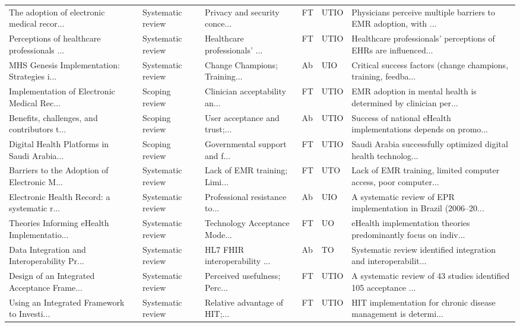 \begin{longtable}{p{3.4cm} >{\centering\arraybackslash}p{0.7cm} p{1.9cm} p{2.4cm} >{\centering\arraybackslash}p{0.8cm} >{\centering\arraybackslash}p{1.1cm} p{3.4cm}}
The adoption of electronic medical recor... & 2020 & Systematic review & Privacy and security conce... & FT & UTIO & Physicians perceive multiple barriers to EMR adoption, with ... \\
Perceptions of healthcare professionals ... & 2020 & Systematic review & Healthcare professionals' ... & FT & UTIO & Healthcare professionals' perceptions of EHRs are influenced... \\
MHS Genesis Implementation: Strategies i... & 2020 & Systematic review & Change Champions; Training... & Ab & UIO & Critical success factors (change champions, training, feedba... \\
Implementation of Electronic Medical Rec... & 2021 & Scoping review & Clinician acceptability an... & FT & UTIO & EMR adoption in mental health is determined by clinician per... \\
Benefits, challenges, and contributors t... & 2021 & Scoping review & User acceptance and trust;... & Ab & UTIO & Success of national eHealth implementations depends on promo... \\
Digital Health Platforms in Saudi Arabia... & 2021 & Scoping review & Governmental support and f... & FT & UTIO & Saudi Arabia successfully optimized digital health technolog... \\
Barriers to the Adoption of Electronic M... & 2021 & Systematic review & Lack of EMR training; Limi... & FT & UTO & Lack of EMR training, limited computer access, poor computer... \\
Electronic Health Record: a systematic r... & 2021 & Systematic review & Professional resistance to... & Ab & UIO & A systematic review of EPR implementation in Brazil (2006–20... \\
Theories Informing eHealth Implementatio... & 2021 & Systematic review & Technology Acceptance Mode... & FT & UO & eHealth implementation theories predominantly focus on indiv... \\
Data Integration and Interoperability Pr... & 2021 & Systematic review & HL7 FHIR interoperability ... & Ab & TO & Systematic review identified integration and interoperabilit... \\
Design of an Integrated Acceptance Frame... & 2022 & Systematic review & Perceived usefulness; Perc... & FT & UTIO & A systematic review of 43 studies identified 105 acceptance ... \\
Using an Integrated Framework to Investi... & 2022 & Systematic review & Relative advantage of HIT;... & FT & UTIO & HIT implementation for chronic disease management is determi... \\

\end{longtable}

